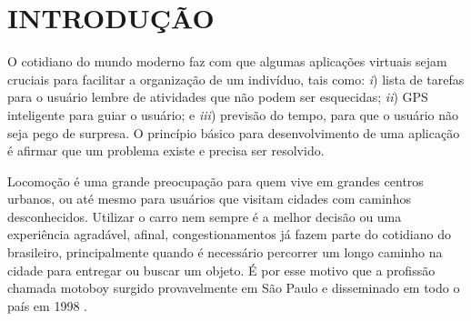 
\chapter{INTRODUÇÃO}


O cotidiano do mundo moderno faz com que algumas aplicações virtuais sejam cruciais para facilitar a organização de um indivíduo, tais como: \textit{i}) lista de tarefas para o usuário lembre de atividades que não podem ser esquecidas; \textit{ii}) GPS inteligente para guiar o usuário; e \textit{iii}) previsão do tempo, para que o usuário não seja pego de surpresa. O princípio básico para desenvolvimento de uma aplicação é afirmar que um problema existe e precisa ser resolvido.


Locomoção é uma grande preocupação para quem vive em grandes centros urbanos, ou até mesmo para usuários que visitam cidades com caminhos desconhecidos. Utilizar o carro nem sempre é a melhor decisão ou uma experiência agradável, afinal, congestionamentos já fazem parte do cotidiano do brasileiro, principalmente quando é necessário percorrer um longo caminho na cidade para entregar ou buscar um objeto. É por esse motivo que a profissão chamada motoboy surgido provavelmente em São Paulo e disseminado em todo o país em 1998 \cite{MotoboyVeja}.

